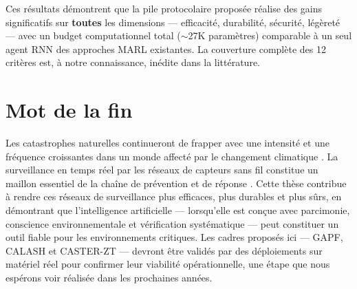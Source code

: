 Ces résultats démontrent que la pile protocolaire proposée réalise des gains significatifs sur \textbf{toutes} les dimensions --- efficacité, durabilité, sécurité, légèreté --- avec un budget computationnel total ($\sim$27K paramètres) comparable à un seul agent RNN des approches MARL existantes. La couverture complète des 12 critères est, à notre connaissance, inédite dans la littérature.

\section*{Mot de la fin}

Les catastrophes naturelles continueront de frapper avec une intensité et une fréquence croissantes dans un monde affecté par le changement climatique \cite{IPCC2021AR6}. La surveillance en temps réel par les réseaux de capteurs sans fil constitue un maillon essentiel de la chaîne de prévention et de réponse \cite{UNDRR2015Sendai}. Cette thèse contribue à rendre ces réseaux de surveillance plus efficaces, plus durables et plus sûrs, en démontrant que l'intelligence artificielle --- lorsqu'elle est conçue avec parcimonie, conscience environnementale et vérification systématique --- peut constituer un outil fiable pour les environnements critiques. Les cadres proposés ici --- GAPF, CALASH et CASTER-ZT --- devront être validés par des déploiements sur matériel réel pour confirmer leur viabilité opérationnelle, une étape que nous espérons voir réalisée dans les prochaines années.
